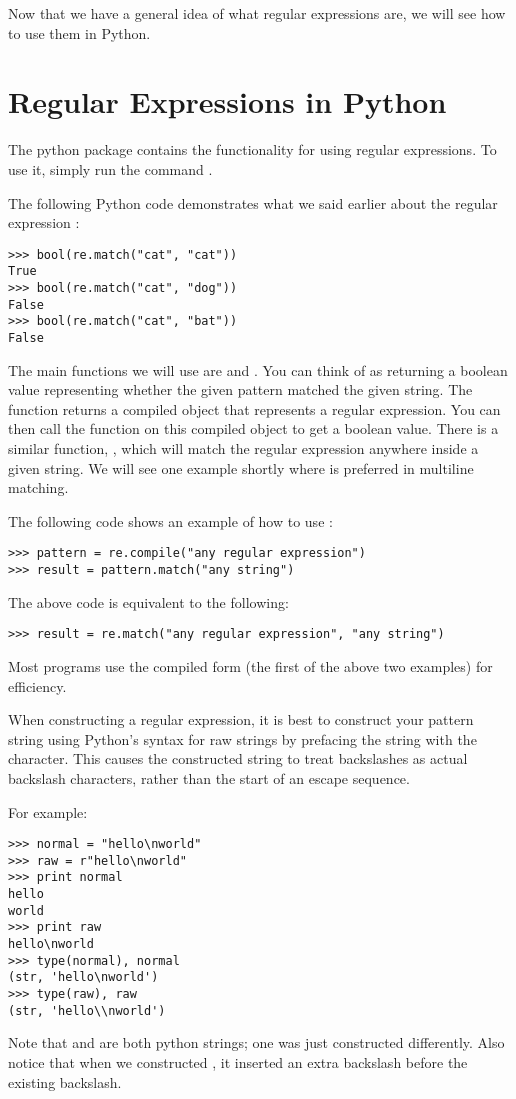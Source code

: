 Now that we have a general idea of what regular expressions are, we will see how to use them in Python.

\section*{Regular Expressions in Python}
The python package  contains the functionality for using regular expressions.
To use it, simply run the command .

The following Python code demonstrates what we said earlier about the regular expression :
\begin{lstlisting}
>>> bool(re.match("cat", "cat"))
True
>>> bool(re.match("cat", "dog"))
False
>>> bool(re.match("cat", "bat"))
False
\end{lstlisting}

The main functions we will use are  and .
You can think of  as returning a boolean value representing whether the given pattern matched the given string.
The function  returns a compiled object that represents a regular expression.
You can then call the  function on this compiled object to get a boolean value.
There is a similar function, , which will match the regular expression anywhere inside a given string.
We will see one example shortly where  is preferred in multiline matching.

The following code shows an example of how to use :
\begin{lstlisting}
>>> pattern = re.compile("any regular expression")
>>> result = pattern.match("any string")
\end{lstlisting}
The above code is equivalent to the following:
\begin{lstlisting}
>>> result = re.match("any regular expression", "any string")
\end{lstlisting}
Most programs use the compiled form (the first of the above two examples) for efficiency.

When constructing a regular expression, it is best to construct your pattern string using Python's syntax for raw strings by prefacing the string with the  character. This causes the constructed string to treat backslashes as actual backslash characters, rather than the start of an escape sequence.

For example:
\begin{lstlisting}
>>> normal = "hello\nworld"
>>> raw = r"hello\nworld"
>>> print normal
hello
world
>>> print raw
hello\nworld
>>> type(normal), normal
(str, 'hello\nworld')
>>> type(raw), raw
(str, 'hello\\nworld')
\end{lstlisting}
Note that  and  are both python strings; one was just constructed differently. Also notice that when we constructed , it inserted an extra backslash before the existing backslash.

